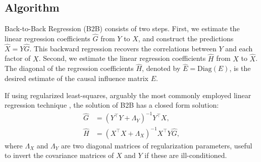 \documentclass{article}
\begin{document}




\subsection{Algorithm}


Back-to-Back Regression (B2B) consists of two steps.
%
First, we estimate the linear regression coefficients $\hat G$ from $Y$ to $X$, and construct the predictions $\hat X = Y \hat G$.
%
This backward regression recovers the correlations between $Y$ and each factor of $X$.
%
Second, we estimate the linear regression coefficients $\hat H$ from $X$ to $\hat X$.
%
The diagonal of the regression coefficients $\hat H$, denoted by $\hat{E} = \text{Diag}(E)$, is the desired estimate of the causal influence matrix $E$.

If using regularized least-squares, arguably the most commonly employed linear regression technique \citep{hoerl1959optimum, rifkin2007notes}, the solution of B2B has a closed form solution:
\begin{align}
    \hat G &= (Y^\top Y + \Lambda_Y)^{-1} Y^\top X,\label{eq:solG}\\
    \hat H &=(X^\top X + \Lambda_X)^{-1} X^\top Y \hat G,\label{eq:solH}
\end{align}
%
where $\Lambda_X$ and $\Lambda_Y$ are two diagonal matrices of regularization parameters, useful to invert the covariance matrices of $X$ and $Y$ if these are ill-conditioned.


\end{document}
